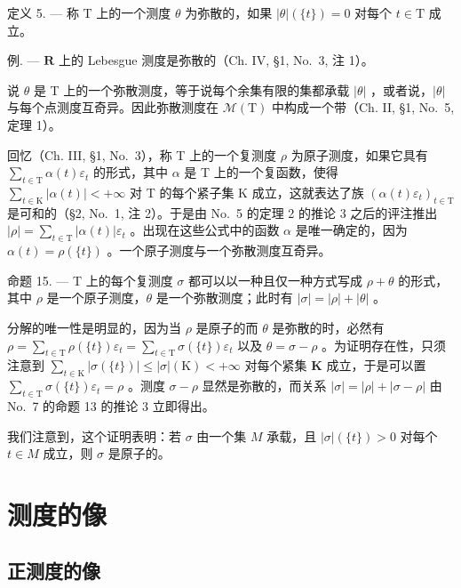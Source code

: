 定义 5. --- 称 T 上的一个测度 \(\theta\) 为弥散的，如果 \(|\theta|(\{t\}) = 0\) 对每个 \(t \in \mathrm{T}\) 成立。

例. --- \(\mathbf{R}\) 上的 Lebesgue 测度是弥散的（Ch. IV, §1, No.~3, 注 1）。

说 \(\theta\) 是 T 上的一个弥散测度，等于说每个余集有限的集都承载 \(|\theta|\) ，或者说，\(|\theta|\) 与每个点测度互奇异。因此弥散测度在 \(\mathcal{M}(\mathrm{T})\) 中构成一个带（Ch. II, §1, No.~5, 定理 1）。

回忆（Ch. III, §1, No.~3），称 T 上的一个复测度 \(\rho\) 为原子测度，如果它具有 \(\sum_{t\in \mathrm{T}}\alpha (t)\varepsilon_t\) 的形式，其中 \(\alpha\) 是 T 上的一个复函数，使得 \(\sum_{t\in \mathrm{K}}|\alpha (t)| < +\infty\) 对 T 的每个紧子集 K 成立，这就表达了族 \(\left(\alpha (t)\varepsilon_t\right)_{t\in \mathrm{T}}\) 是可和的（§2, No.~1, 注 2）。于是由 No.~5 的定理 2 的推论 3 之后的评注推出 \(|\rho| = \sum_{t\in \mathrm{T}}|\alpha (t)|\varepsilon_t\) 。出现在这些公式中的函数 \(\alpha\) 是唯一确定的，因为 \(\alpha (t) = \rho (\{t\})\) 。一个原子测度与一个弥散测度互奇异。

命题 15. --- T 上的每个复测度 \(\sigma\) 都可以以一种且仅一种方式写成 \(\rho + \theta\) 的形式，其中 \(\rho\) 是一个原子测度，\(\theta\) 是一个弥散测度；此时有 \(|\sigma| = |\rho| + |\theta|\) 。

分解的唯一性是明显的，因为当 \(\rho\) 是原子的而 \(\theta\) 是弥散的时，必然有 \(\rho = \sum_{t\in \mathrm{T}}\rho (\{t\})\varepsilon_t = \sum_{t\in \mathrm{T}}\sigma (\{t\})\varepsilon_t\) 以及 \(\theta = \sigma -\rho\) 。为证明存在性，只须注意到 \(\sum_{t\in \mathrm{K}}|\sigma (\{t\})| \leqslant |\sigma |(\mathrm{K}) < +\infty\) 对每个紧集 \(\mathbf{K}\) 成立，于是可以置 \(\sum_{t\in \mathrm{T}}\sigma (\{t\})\varepsilon_t = \rho\) 。测度 \(\sigma -\rho\) 显然是弥散的，而关系 \(|\sigma | = |\rho | + |\sigma -\rho |\) 由 No.~7 的命题 13 的推论 3 立即得出。

我们注意到，这个证明表明：若 \(\sigma\) 由一个集 \(M\) 承载，且 \(|\sigma| (\{t\}) > 0\) 对每个 \(t \in M\) 成立，则 \(\sigma\) 是原子的。

\section{测度的像}

\subsection{正测度的像}

